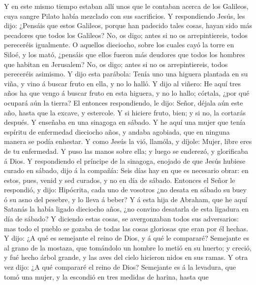  Y en este mismo tiempo estaban allí unos que le contaban
acerca de los Galileos, cuya sangre Pilato había mezclado con sus
sacrificios.  Y respondiendo Jesús, les dijo: ¿Pensáis que
estos Galileos, porque han padecido tales cosas, hayan sido más
pecadores que todos los Galileos?  No, os digo; antes si
no os arrepintiereis, todos pereceréis igualmente.  O
aquellos dieciocho, sobre los cuales cayó la torre en Siloé, y los mató,
¿pensáis que ellos fueron más deudores que todos los hombres que habitan
en Jerusalem?  No, os digo; antes si no os arrepintiereis,
todos pereceréis asimismo.  Y dijo esta parábola: Tenía
uno una higuera plantada en su viña, y vino á buscar fruto en ella, y no
lo halló.  Y dijo al viñero: He aquí tres años ha que
vengo á buscar fruto en esta higuera, y no lo hallo; córtala, ¿por qué
ocupará aún la tierra?  El entonces respondiendo, le dijo:
Señor, déjala aún este año, hasta que la excave, y estercole.
 Y si hiciere fruto, bien; y si no, la cortarás después.
 Y enseñaba en una sinagoga en sábado.  Y
he aquí una mujer que tenía espíritu de enfermedad dieciocho años, y
andaba agobiada, que en ninguna manera se podía enhestar.
 Y como Jesús la vió, llamóla, y díjole: Mujer, libre
eres de tu enfermedad.  Y puso las manos sobre ella; y
luego se enderezó, y glorificaba á Dios.  Y respondiendo
el príncipe de la sinagoga, enojado de que Jesús hubiese curado en
sábado, dijo á la compañía: Seis días hay en que es necesario obrar: en
estos, pues, venid y sed curados, y no en día de sábado. 
Entonces el Señor le respondió, y dijo: Hipócrita, cada uno de vosotros
¿no desata en sábado su buey ó su asno del pesebre, y lo lleva á beber?
 Y á esta hija de Abraham, que he aquí Satanás la había
ligado dieciocho años, ¿no convino desatarla de esta ligadura en día de
sábado?  Y diciendo estas cosas, se avergonzaban todos
sus adversarios: mas todo el pueblo se gozaba de todas las cosas
gloriosas que eran por él hechas.  Y dijo: ¿A qué es
semejante el reino de Dios, y á qué le compararé? 
Semejante es al grano de la mostaza, que tomándolo un hombre lo metió en
su huerto; y creció, y fué hecho árbol grande, y las aves del cielo
hicieron nidos en sus ramas.  Y otra vez dijo: ¿A qué
compararé el reino de Dios?  Semejante es á la levadura,
que tomó una mujer, y la escondió en tres medidas de harina, hasta que
